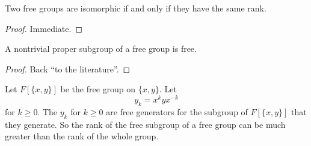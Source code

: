 \begin{theorem}
    Two free groups are isomorphic if and only if they have the same rank.
\end{theorem}
\begin{proof}
    Immediate.
\end{proof}
\begin{theorem}
A nontrivial proper subgroup of a free group is free.    
\end{theorem}
\begin{proof}
    Back ``to the literature''.
\end{proof}
\begin{example}
    Let $F[\{x,y\}]$ be the free group on $\{x,y\} $. Let \[
    y_k=x^{k}yx^{-k}
\] for $k \geq 0$. The $y_k$ for $k\geq 0$ are free generators for the subgroup of $F[\{x,y\}]$ that they generate. So the rank of the free subgroup of a free group can be much greater than the rank of the whole group.
\end{example}
